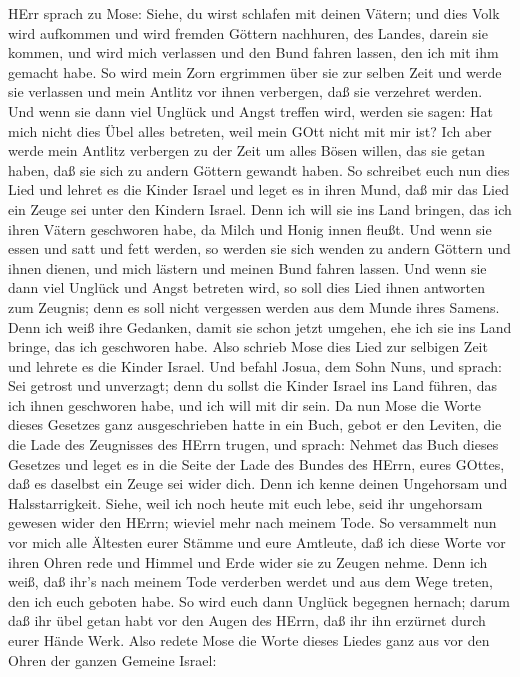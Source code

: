 HErr sprach zu Mose: Siehe, du wirst schlafen mit deinen Vätern; und
dies Volk wird aufkommen und wird fremden Göttern nachhuren, des Landes,
darein sie kommen, und wird mich verlassen und den Bund fahren lassen,
den ich mit ihm gemacht habe.  So wird mein Zorn ergrimmen
über sie zur selben Zeit und werde sie verlassen und mein Antlitz vor
ihnen verbergen, daß sie verzehret werden. Und wenn sie dann viel
Unglück und Angst treffen wird, werden sie sagen: Hat mich nicht dies
Übel alles betreten, weil mein GOtt nicht mit mir ist?  Ich
aber werde mein Antlitz verbergen zu der Zeit um alles Bösen willen, das
sie getan haben, daß sie sich zu andern Göttern gewandt haben.
 So schreibet euch nun dies Lied und lehret es die Kinder
Israel und leget es in ihren Mund, daß mir das Lied ein Zeuge sei unter
den Kindern Israel.  Denn ich will sie ins Land bringen,
das ich ihren Vätern geschworen habe, da Milch und Honig innen fleußt.
Und wenn sie essen und satt und fett werden, so werden sie sich wenden
zu andern Göttern und ihnen dienen, und mich lästern und meinen Bund
fahren lassen.  Und wenn sie dann viel Unglück und Angst
betreten wird, so soll dies Lied ihnen antworten zum Zeugnis; denn es
soll nicht vergessen werden aus dem Munde ihres Samens. Denn ich weiß
ihre Gedanken, damit sie schon jetzt umgehen, ehe ich sie ins Land
bringe, das ich geschworen habe.  Also schrieb Mose dies
Lied zur selbigen Zeit und lehrete es die Kinder Israel. 
Und befahl Josua, dem Sohn Nuns, und sprach: Sei getrost und unverzagt;
denn du sollst die Kinder Israel ins Land führen, das ich ihnen
geschworen habe, und ich will mit dir sein.  Da nun Mose
die Worte dieses Gesetzes ganz ausgeschrieben hatte in ein Buch,
 gebot er den Leviten, die die Lade des Zeugnisses des
HErrn trugen, und sprach:  Nehmet das Buch dieses Gesetzes
und leget es in die Seite der Lade des Bundes des HErrn, eures GOttes,
daß es daselbst ein Zeuge sei wider dich.  Denn ich kenne
deinen Ungehorsam und Halsstarrigkeit. Siehe, weil ich noch heute mit
euch lebe, seid ihr ungehorsam gewesen wider den HErrn; wieviel mehr
nach meinem Tode.  So versammelt nun vor mich alle Ältesten
eurer Stämme und eure Amtleute, daß ich diese Worte vor ihren Ohren rede
und Himmel und Erde wider sie zu Zeugen nehme.  Denn ich
weiß, daß ihr's nach meinem Tode verderben werdet und aus dem Wege
treten, den ich euch geboten habe. So wird euch dann Unglück begegnen
hernach; darum daß ihr übel getan habt vor den Augen des HErrn, daß ihr
ihn erzürnet durch eurer Hände Werk.  Also redete Mose die
Worte dieses Liedes ganz aus vor den Ohren der ganzen Gemeine Israel:

